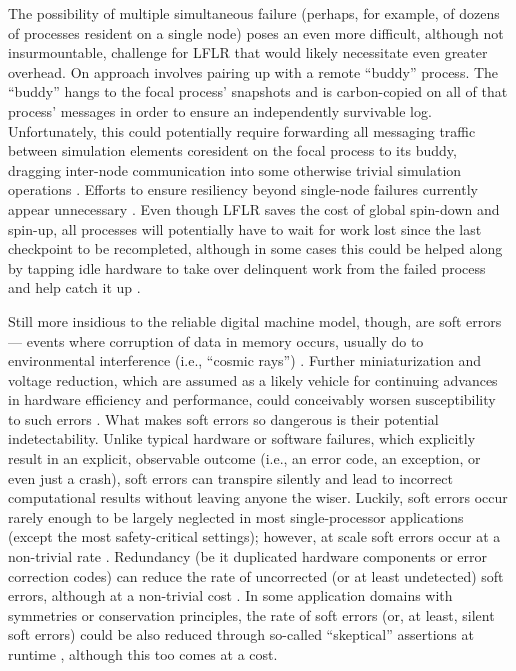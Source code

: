 The possibility of multiple simultaneous failure (perhaps, for example, of dozens of processes resident on a single node) poses an even more difficult, although not insurmountable, challenge for LFLR that would likely necessitate even greater overhead.
On approach involves pairing up with a remote ``buddy'' process.
The ``buddy'' hangs to the focal process' snapshots and is carbon-copied on all of that process' messages in order to ensure an independently survivable log.
Unfortunately, this could potentially require forwarding all messaging traffic between simulation elements coresident on the focal process to its buddy, dragging inter-node communication into some otherwise trivial simulation operations \citep{chakravorty2007fault}.
Efforts to ensure resiliency beyond single-node failures currently appear unnecessary \citep[p. 12]{ni2016mitigation}.
Even though LFLR saves the cost of global spin-down and spin-up, all processes will potentially have to wait for work lost since the last checkpoint to be recompleted, although in some cases this could be helped along by tapping idle hardware to take over delinquent work from the failed process and help catch it up \citep{dongarra2014applied}.

Still more insidious to the reliable digital machine model, though, are soft errors --- events where corruption of data in memory occurs, usually do to environmental interference (i.e., ``cosmic rays'') \citep{karnik2004characterization}.
Further miniaturization and voltage reduction, which are assumed as a likely vehicle for continuing advances in hardware efficiency and performance, could conceivably worsen susceptibility to such errors \citep{dongarra2014applied,kajmakovic2020challenges}.
What makes soft errors so dangerous is their potential indetectability.
Unlike typical hardware or software failures, which explicitly result in an explicit, observable outcome (i.e., an error code, an exception, or even just a crash), soft errors can transpire silently and lead to incorrect computational results without leaving anyone the wiser.
Luckily, soft errors occur rarely enough to be largely neglected in most single-processor applications (except the most safety-critical settings); however, at scale soft errors occur at a non-trivial rate \citep{sridharan2015memory,scoles2018cosmic}.
Redundancy (be it duplicated hardware components or error correction codes) can reduce the rate of uncorrected (or at least undetected) soft errors, although at a non-trivial cost \citep{vankeirsbilck2015soft,sridharan2015memory}.
In some application domains with symmetries or conservation principles, the rate of soft errors (or, at least, silent soft errors) could be also reduced through so-called ``skeptical'' assertions at runtime \citep{dongarra2014applied}, although this too comes at a cost.

